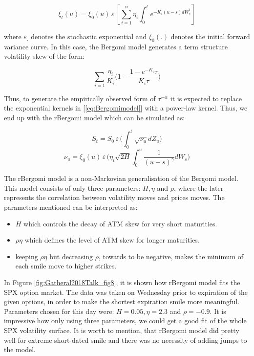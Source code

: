 \documentclass[12pt,oneside]{article}
\begin{document}
\begin{equation}
\label{eq:Bergomimodel}
    \xi_{t}(u) = \xi_{0}(u) \,\varepsilon\,\left[\sum_{i=1}^{n} \eta_{i} \int_{0}^{t} e^{-K_{i}(u-s) dW_{s}^{i}}\right]
\end{equation}

where $\varepsilon_{.}$ denotes the stochastic exponential and $\xi_{0}(.)$ denotes the initial forward variance curve. In this case, the Bergomi model generates a term structure volatility skew of the form:

$$\sum_{i=1}^{} \frac{\eta_{i}}{K_{i}} \Big(1- \frac{1-e^{-K_{i}} \tau}{{K_{i}} \tau}\Big)$$

Thus, to generate the empirically observed form of $\tau^{-\alpha}$ it is expected to replace the exponential kernels in [\ref{eq:Bergomimodel}] with a power-law kernel. Thus, we end up with the rBergomi model which can be simulated as:

\begin{equation}
    S_{t} = S_{0} \,\varepsilon\, \Big(\int_{0}^{t} \sqrt{\nu_{u}} dZ_{u}\Big)
\end{equation}
\begin{equation}
    \nu_{u} = \xi_{0}(u)\, \varepsilon \, \Big( \eta_{i} \sqrt{2H} \int_{0}^{u} \frac{1}{(u-s)^{\gamma}} dW_{s}\Big)
\end{equation}

The rBergomi model is a non-Markovian generalisation of the Bergomi model. This model consists of only three parameters: $H, \eta$ and $\rho$, where the later represents the correlation between volatility moves and prices moves. The parameters mentioned can be interpreted as:

\begin{itemize}
    \item $H$ which controls the decay of ATM skew for very short maturities.
    \item $\rho \eta$ which defines the level of ATM skew for longer maturities.
    \item keeping $\rho \eta$ but decreasing $\rho$, towards to be negative, makes the minimum of each smile move to higher strikes.
\end{itemize}

In Figure \ref{fig:Gatheral2018Talk_fig8}, it is shown how rBergomi model fits the SPX option market. The data was taken on Wednesday prior to expiration of the given options, in order to make the shortest expiration smile more meaningful. Parameters chosen for this day were: $H = 0.05, \eta = 2.3$ and $\rho = -0.9$. It is impressive how only using three parameters, we could get a good fit of the whole SPX volatility surface. It is worth to mention, that rBergomi model did pretty well for extreme short-dated smile and there was no necessity of adding jumps to the model.
\end{document}
